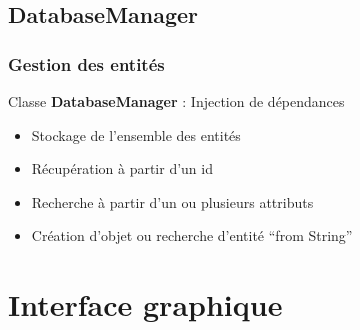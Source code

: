 \documentclass{beamer}
\begin{document}
\subsection{DatabaseManager}
\begin{frame}
  \frametitle{Gestion des entités}
  Classe \textbf{DatabaseManager} : Injection de dépendances
  \begin{itemize}
  \item Stockage de l'ensemble des entités
  \item Récupération à partir d'un id
  \item Recherche à partir d'un ou plusieurs attributs
  \item Création d'objet ou recherche d'entité ``from String''
  \end{itemize}
\end{frame}

\author{RIVOIRE Claire}



\section{Interface graphique}
\end{document}
